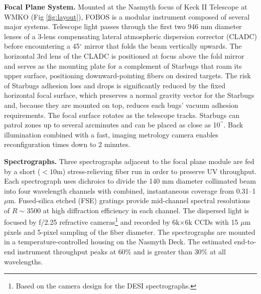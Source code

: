 \documentclass[oneside,11pt]{amsart}
\newcommand{\arcsec}{\mbox{$^{\prime\prime}$}}
\begin{document}
\noindent \textbf{Focal Plane System.} Mounted at the Nasmyth focus
of Keck II Telescope at WMKO (Fig \ref{fig:layout}), FOBOS is a
modular instrument composed of several major systems. Telescope light
passes through the first two 946 mm diameter lenses of a 3-lens
compensating lateral atmospheric dispersion corrector (CLADC) before
encountering a 45$^\circ$ mirror that folds the beam vertically
upwards. The horizontal 3rd lens of the CLADC is positioned at focus
above the fold mirror and serves as the mounting plate for a
complement of Starbugs that roam its upper surface, positioning
downward-pointing fibers on desired targets. The risk of Starbugs
adhesion loss and drops is significantly reduced by the fixed
horizontal focal surface, which preserves a normal gravity vector for
the Starbugs and, because they are mounted on top, reduces each bugs'
vacuum adhesion requirements. The focal surface rotates as the
telescope tracks. Starbugs can patrol zones up to several arcminutes
and can be placed as close as 10\arcsec{}. Back illumination combined
with a fast, imaging metrology camera enables reconfiguration times
down to 2 minutes.




\noindent \textbf{Spectrographs.} Three spectrographs adjacent to the
focal plane module are fed by a short ($< 10$m) stress-relieving
fiber run in order to preserve UV throughput. Each spectrograph uses
dichroics to divide the 140 mm diameter collimated beam into four
wavelength channels with combined, instantaneous coverage from
0.31--1 $\mu$m. Fused-silica etched (FSE) gratings provide
mid-channel spectral resolutions of $R \sim 3500$ at high diffraction
efficiency in each channel. The dispersed light is focused by f/2.25
refractive cameras\footnote{Based on the camera design for the DESI
spectrographs.} and recorded by 6k$\times$6k CCDs with 15 $\mu$m
pixels and 5-pixel sampling of the fiber diameter. The spectrographs
are mounted in a temperature-controlled housing on the Nasmyth Deck.
The estimated end-to-end instrument throughput peaks at 60\% and is
greater than 30\% at all wavelengths.
\end{document}
